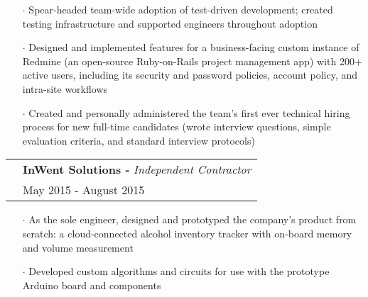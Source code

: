 \documentclass[a4paper, oneside, final]{scrartcl} %
\newcommand{\gray}{\rowcolor[gray]{.90}} %
\begin{document}
\begin{center}
\begin{itemize}
    \item[$\cdot$] Spear-headed team-wide adoption of test-driven development; created testing infrastructure and supported engineers throughout adoption \\
    \item[$\cdot$] Designed and implemented features for a business-facing custom instance of Redmine (an open-source Ruby-on-Rails project management app) with 200+ active users, including its security and password policies, account policy, and intra-site workflows \\
    \item[$\cdot$] Created and personally administered the team’s first ever technical hiring process for new full-time candidates (wrote interview questions, simple evaluation criteria, and standard interview protocols)\\

  \end{itemize}

  \vspace{-0.05cm}

  \begin{tabularx}{1.00\linewidth}{>{\raggedleft\scshape}p{0cm}X}
    \gray& \textbf{InWent Solutions -} \textit{Independent Contractor}\\
    \gray& {May 2015 - August 2015}\\
  \end{tabularx}
  \vspace{-0.2cm}
  \begin{itemize}\itemsep-0.2cm
      \vspace{-0.1cm}

    \item[$\cdot$] As the sole engineer, designed and prototyped the company’s product from scratch: a cloud-connected alcohol inventory tracker with on-board memory and volume measurement  \\
    \item[$\cdot$] Developed custom algorithms and circuits for use with the prototype Arduino board and components\\


\end{itemize}
\end{center}
\end{document}
